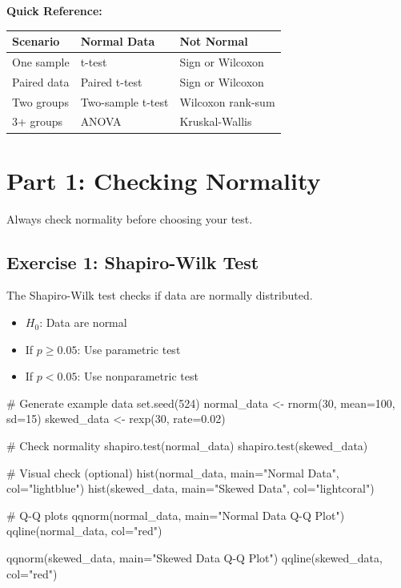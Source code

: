 \documentclass[11pt]{article}
\begin{document}
\vspace{0.3cm}
\textbf{Quick Reference:}
\begin{center}
\small
\begin{tabular}{lll}
\toprule
\textbf{Scenario} & \textbf{Normal Data} & \textbf{Not Normal} \\
\midrule
One sample & t-test & Sign or Wilcoxon \\
Paired data & Paired t-test & Sign or Wilcoxon \\
Two groups & Two-sample t-test & Wilcoxon rank-sum \\
3+ groups & ANOVA & Kruskal-Wallis \\
\bottomrule
\end{tabular}
\end{center}

\section{Part 1: Checking Normality}

Always check normality before choosing your test.

\subsection{Exercise 1: Shapiro-Wilk Test}

The Shapiro-Wilk test checks if data are normally distributed.
\begin{itemize}
\item $H_0$: Data are normal
\item If $p \geq 0.05$: Use parametric test
\item If $p < 0.05$: Use nonparametric test
\end{itemize}

\begin{rcode}
# Generate example data
set.seed(524)
normal_data <- rnorm(30, mean=100, sd=15)
skewed_data <- rexp(30, rate=0.02)

# Check normality
shapiro.test(normal_data)
shapiro.test(skewed_data)

# Visual check (optional)
hist(normal_data, main="Normal Data", col="lightblue")
hist(skewed_data, main="Skewed Data", col="lightcoral")

# Q-Q plots
qqnorm(normal_data, main="Normal Data Q-Q Plot")
qqline(normal_data, col="red")

qqnorm(skewed_data, main="Skewed Data Q-Q Plot")
qqline(skewed_data, col="red")
\end{rcode}
\end{document}
